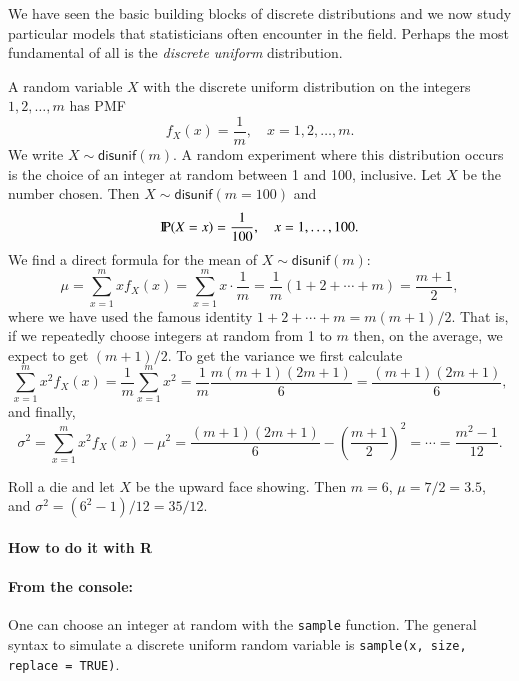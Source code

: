 \documentclass[captions=tableheading]{scrbook}
\begin{document}
We have seen the basic building blocks of discrete distributions and we now study particular models that statisticians often encounter in the field. Perhaps the most fundamental of all is the \emph{discrete uniform} distribution.

A random variable \(X\) with the discrete uniform distribution on the integers \(1,2,\ldots,m\) has PMF
\begin{equation}
f_{X}(x)=\frac{1}{m},\quad x=1,2,\ldots,m.
\end{equation}
We write \(X\sim\mathsf{disunif}(m)\). A random experiment where this distribution occurs is the choice of an integer at random between 1 and 100, inclusive. Let \(X\) be the number chosen. Then \(X\sim\mathsf{disunif}(m=100)\) and
\[
\P(X=x)=\frac{1}{100},\quad x=1,\ldots,100.
\]
We find a direct formula for the mean of \(X\sim\mathsf{disunif}(m)\):
\begin{equation}
\mu=\sum_{x=1}^{m}xf_{X}(x)=\sum_{x=1}^{m}x\cdot\frac{1}{m}=\frac{1}{m}(1+2+\cdots+m)=\frac{m+1}{2},
\end{equation}
where we have used the famous identity \(1+2+\cdots+m=m(m+1)/2\). That is, if we repeatedly choose integers at random from 1 to \(m\) then, on the average, we expect to get \((m+1)/2\). To get the variance we first calculate
\[
\sum_{x=1}^{m}x^{2}f_{X}(x)=\frac{1}{m}\sum_{x=1}^{m}x^{2}=\frac{1}{m}\frac{m(m+1)(2m+1)}{6}=\frac{(m+1)(2m+1)}{6},
\]
and finally,
\begin{equation}
\sigma^{2}=\sum_{x=1}^{m}x^{2}f_{X}(x)-\mu^{2}=\frac{(m+1)(2m+1)}{6}-\left(\frac{m+1}{2}\right)^{2}=\cdots=\frac{m^{2}-1}{12}.
\end{equation}

\begin{example}
Roll a die and let \(X\) be the upward face showing. Then \(m=6\), \(\mu=7/2=3.5\), and \(\sigma^{2}=(6^{2}-1)/12=35/12\).
\end{example}

\paragraph*{How to do it with \textsf{R}}

\paragraph*{From the console:}
One can choose an integer at random with the \texttt{sample} function. The general syntax to simulate a discrete uniform random variable is \texttt{sample(x, size, replace = TRUE)}.
\end{document}
